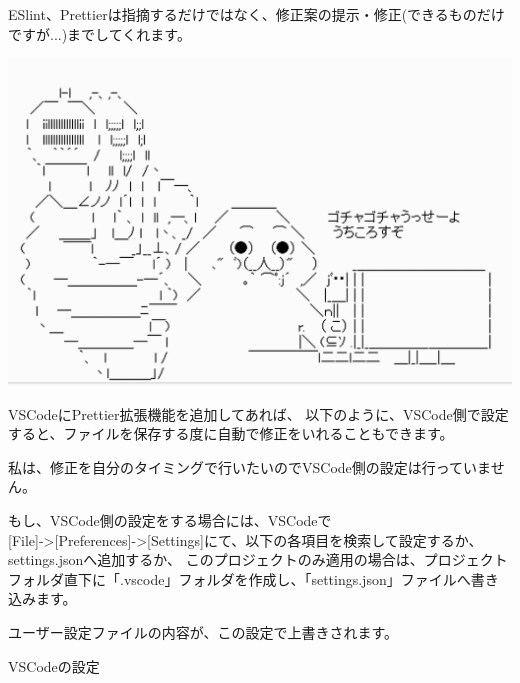 ESlint、Prettierは指摘するだけではなく、修正案の提示・修正(できるものだけですが...)までしてくれます。

\begin{reviewimage}%
\includegraphics[width=0.6\maxwidth]{./images/02-create-react-app/shutup.png}%
\label{image:02-create-react-app:shutup}
\end{reviewimage}
\vspace*{\baselineskip}

VSCodeにPrettier拡張機能を追加してあれば、
以下のように、VSCode側で設定すると、ファイルを保存する度に自動で修正をいれることもできます。

\vspace*{\baselineskip}

私は、修正を自分のタイミングで行いたいのでVSCode側の設定は行っていません。

\vspace*{\baselineskip}

もし、VSCode側の設定をする場合には、VSCodeで\\[0pt]
[File]{-}\textgreater{}[Preferences]{-}\textgreater{}[Settings]にて、以下の各項目を検索して設定するか、settings.jsonへ追加するか、
このプロジェクトのみ適用の場合は、プロジェクトフォルダ直下に「.vscode」フォルダを作成し、「settings.json」ファイルへ書き込みます。

ユーザー設定ファイルの内容が、この設定で上書きされます。

\def\startercodeblockfontsize{}
\begin{starterprogram}[]{VSCodeの設定}\end{starterprogram}

